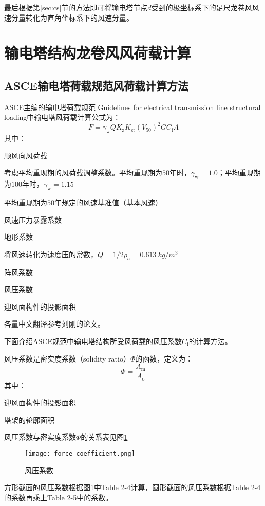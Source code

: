 最后根据第\ref{sec:cs}节的方法即可将输电塔节点$d$受到的极坐标系下的足尺龙卷风风速分量转化为直角坐标系下的风速分量。


\section{输电塔结构龙卷风风荷载计算}

\subsection{ASCE输电塔荷载规范风荷载计算方法}
ASCE主编的输电塔荷载规范 Guidelines for electrical transmission line structural loading\cite{wong2009guidelines}中输电塔风荷载计算公式为：
\begin{equation}
F = \gamma_{\mathrm{w}} Q K_{\mathrm{z}} K_{\mathrm{zt}} \left( V_{50}\right)^2 G C_{\mathrm{f}} A
\end{equation}
其中：
\begin{description}[leftmargin=!,labelwidth=2em]
\item[$F$] 顺风向风荷载
\item[$\gamma_{\mathrm{w}}$] 考虑平均重现期的风荷载调整系数。平均重现期为$50$年时，$\gamma_{\mathrm{w}}=1.0$；平均重现期为$100$年时，$\gamma_{\mathrm{w}}=1.15$
\item[$V_{50}$] 平均重现期为$50$年规定的风速基准值（基本风速）
\item[$K_{\mathrm{z}}$] 风速压力暴露系数
\item[$K_{\mathrm{zt}}$] 地形系数
\item[$Q$] 将风速转化为速度压的常数，$Q=1/2 \rho_a=\SI{0.613}{kg/m^3}$
\item[$G$] 阵风系数
\item[$C_{\mathrm{f}}$] 风压系数
\item[$A$] 迎风面构件的投影面积
\end{description}
各量中文翻译参考刘刚的论文\cite{liu2010wind}。

下面介绍ASCE规范中输电塔结构所受风荷载的风压系数$C_{\mathrm{f}}$的计算方法。

风压系数是密实度系数（solidity ratio）$\Phi$的函数，定义为：
\begin{equation}
\Phi = \frac{A_\mathrm{m}}{A_\mathrm{o}}
\end{equation}
其中：
\begin{description}[leftmargin=!,labelwidth=2em]
\item[$A_\mathrm{m}$] 迎风面构件的投影面积
\item[$A_\mathrm{o}$] 塔架的轮廓面积
\end{description}
风压系数与密实度系数$\Phi$的关系表见图\ref{fig:force-coefficient}\cite{wong2009guidelines}
\begin{figure}[!htbp]
\centering
\texttt{[image: force\_coefficient.png]}
\caption{风压系数}\label{fig:force-coefficient}
\end{figure}
方形截面的风压系数根据图\ref{fig:force-coefficient}中Table 2-4计算，圆形截面的风压系数根据Table 2-4的系数再乘上Table 2-5中的系数。

